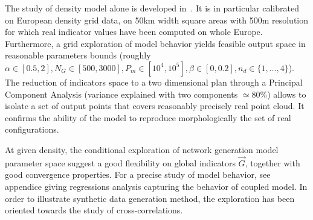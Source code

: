 The study of density model alone is developed in~\cite{raimbault2016calibration}. It is in particular calibrated on European density grid data, on 50km width square areas with 500m resolution for which real indicator values have been computed on whole Europe. Furthermore, a grid exploration of model behavior yields feasible output space in reasonable parameters bounds (roughly $\alpha \in [0.5,2],N_G\in [500,3000], P_m \in [10^4,10^5],\beta\in [0,0.2], n_d \in \{ 1, \ldots , 4\}$). The reduction of indicators space to a two dimensional plan through a Principal Component Analysis (variance explained with two components $\simeq 80\%$) allows to isolate a set of output points that covers reasonably precisely real point cloud. It confirms the ability of the model to reproduce morphologically the set of real configurations.




At given density, the conditional exploration of network generation model parameter space suggest a good flexibility on global indicators $\vec{G}$, together with good convergence properties. For a precise study of model behavior, see appendice giving regressions analysis capturing the behavior of coupled model. In order to illustrate synthetic data generation method, the exploration has been oriented towards the study of cross-correlations.




